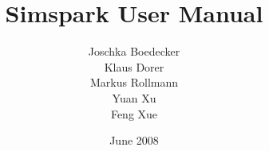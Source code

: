 

\author{Joschka Boedecker \\ Klaus Dorer \\ Markus Rollmann \\ Yuan Xu
\\ Feng Xue}
\title{Simspark User Manual}

\date{June 2008}



\maketitle
\cleardoublepage
\pagestyle{fancy}


\setlength{\headheight}{14pt}
\setlength{\parindent}{0.7cm}

\frontmatter
\tableofcontents
\mainmatter












\backmatter




\printindex 


